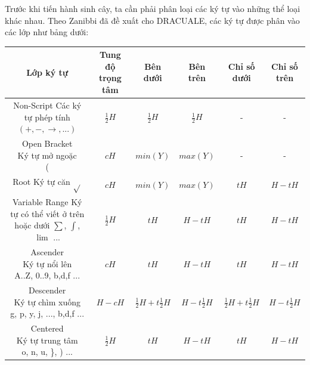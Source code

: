 \documentclass[a4paper]{article}
\theoremstyle{definition}
\begin{document}
	Trước khi tiến hành sinh cây, ta cần phải phân loại các ký tự vào những thể loại khác nhau. Theo Zanibbi đã đề xuất cho DRACUALE\cite{zanibbi}, các ký tự được phân vào các lớp như bảng dưới:
	
	\begin{center}
		\begin{tabular}{||c | c | c c c c ||} 
			\hline
			Lớp ký tự & Tung độ trọng tâm & Bên dưới & Bên trên & Chỉ số dưới & Chỉ số trên \\ [0.5ex] 
			\hline\hline
			\makecell{Non-Script \\ Các ký tự phép tính\\ $(+, -, \rightarrow, ... )$} & $\frac{1}{2}H$ & $\frac{1}{2}H$ & $\frac{1}{2}H$ & - & - \\ 
			\hline
			\makecell{Open Bracket \\ Ký tự mở ngoặc \\ ( } & $cH$ & $min(Y)$ & $max(Y)$ & - & - \\
			\hline
			\makecell{Root \\ Ký tự căn \\ $\sqrt{}$ } & $cH$ & $min(Y)$ & $max(Y)$ & $tH$ & $H - tH$ \\
			\hline
			\makecell{Variable Range \\ Ký tự có thể viết \\ ở trên hoặc dưới \\ $\sum$, $\int$, $\lim$ ... } & $\frac{1}{2}H$ & $tH$ & $H-tH$ & $tH$ & $H- tH$ \\
			\hline
			\makecell{Ascender \\ Ký tự nổi lên \\ A..Z, 0..9, b,d,f ... } & $cH$ &  $tH$ & $H-tH$ & $tH$ & $H- tH$ \\
			\hline
			\makecell{Descender \\ Ký tự chìm xuống \\ g, p, y, j, ..., b,d,f ... } & $H - cH$ &  $\frac{1}{2}H + t\frac{1}{2}H$ & $H-t\frac{1}{2}H$ & $\frac{1}{2}H + t\frac{1}{2}H$ & $H-t\frac{1}{2}H$ \\ 
			\hline
			\makecell{Centered \\ Ký tự trung tâm \\ o, n, u, \}, ) ... } & $\frac{1}{2}H$ &  $tH$ & $H-tH$ & $tH$ & $H- tH$
			\\ \hline
			
			
		\end{tabular}
		
	\end{center}
	
\end{document}

